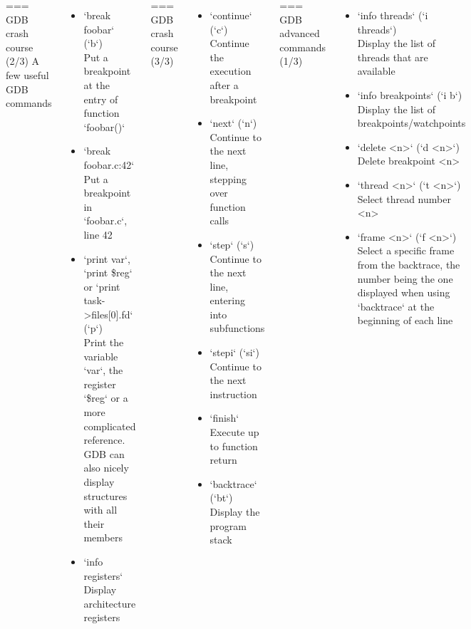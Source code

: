 \begin{columns}[T]
=== GDB crash course (2/3)
  \small
  A few useful GDB commands
  \begin{itemize}
  \item `break foobar` (`b`)\\
    Put a breakpoint at the entry of function `foobar()`
  \item `break foobar.c:42`\\
    Put a breakpoint in `foobar.c`, line 42
  \item `print var`, `print \$reg` or `print task->files[0].fd` (`p`)\\
    Print the variable `var`, the register `\$reg` or a more
    complicated reference. GDB can also nicely display structures with all
    their members
  \item `info registers`\\
    Display architecture registers
  \end{itemize}


=== GDB crash course (3/3)
  \small
  \begin{itemize}
  \item `continue` (`c`)\\
    Continue the execution after a breakpoint
  \item `next` (`n`)\\
    Continue to the next line, stepping over function calls
  \item `step` (`s`)\\
    Continue to the next line, entering into subfunctions
  \item `stepi` (`si`)\\
    Continue to the next instruction
  \item `finish`\\
    Execute up to function return
  \item `backtrace` (`bt`)\\
    Display the program stack
  \end{itemize}


{
=== GDB advanced commands (1/3)
  \small
  \begin{itemize}
    \item `info threads` (`i threads`)\\
      Display the list of threads that are available
    \item `info breakpoints` (`i b`)\\
      Display the list of breakpoints/watchpoints
    \item `delete <n>` (`d <n>`)\\
      Delete breakpoint <n>
    \item `thread <n>` (`t <n>`)\\
      Select thread number <n>
    \item `frame <n>` (`f <n>`)\\
      Select a specific frame from the backtrace, the number being the one
      displayed when using `backtrace` at the beginning of each line
  \end{itemize}


}
\end{columns}
